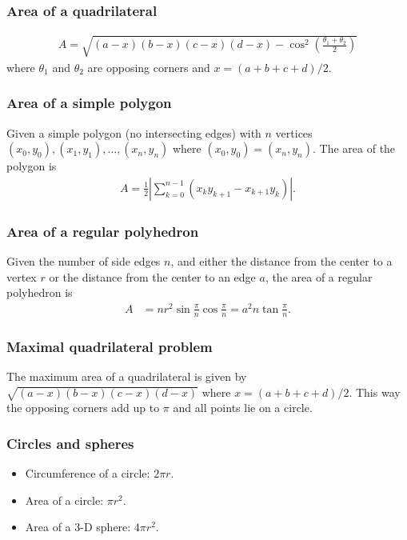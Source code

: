 \subsubsection{Area of a quadrilateral}
\begin{align*}
    A = \sqrt{(a-x)(b-x)(c-x)(d-x) - \cos^2\left(\frac{\theta_1 + \theta_2}2\right)}
\end{align*}
where $\theta_1$ and $\theta_2$ are opposing corners and $x = (a + b + c + d)/2$.

\subsubsection{Area of a simple polygon}
Given a simple polygon (no intersecting edges) with $n$ vertices $(x_0, y_0), (x_1, y_1), \dots, (x_n, y_n)$ where $(x_0, y_0) = (x_n, y_n)$. The area of the polygon is
\begin{align*}
    A = \frac12\left|\sum_{k=0}^{n-1} (x_ky_{k+1} - x_{k+1}y_k)\right|.
\end{align*}

\subsubsection{Area of a regular polyhedron}
Given the number of side edges $n$, and either the distance from the center to a vertex $r$ or the distance from the center to an edge $a$, the area of a regular polyhedron is
\begin{align*}
    A &= nr^2\sin\frac{\pi}{n}\cos\frac{\pi}{n} = a^2n\tan\frac{\pi}{n}.
\end{align*}

\subsubsection{Maximal quadrilateral problem}
The maximum area of a quadrilateral is given by $\sqrt{(a-x)(b-x)(c-x)(d-x)}$ where $x = (a + b + c + d)/2$. This way the opposing corners add up to $\pi$ and all points lie on a circle.

\subsubsection{Circles and spheres}
\begin{itemize}
    \item Circumference of a circle: $2\pi r$.
    \item Area of a circle: $\pi r^2$.
    \item Area of a $3$-D sphere: $4\pi r^2$.
\end{itemize}

